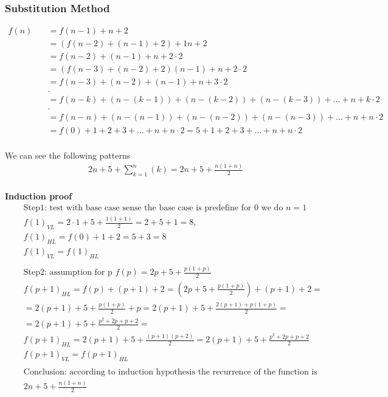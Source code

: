 \subsubsection{Substitution Method}
\begin{align*}
  f(n) &\quad = f(n-1) + n + 2  \\
  &\quad = (f(n-2) + (n-1) + 2) +1n +2 \\               &\quad = f(n-2) + (n-1) + n +2 \cdot 2 \\
  &\quad = (f(n-3) + (n-2) + 2) (n-1) + n +2 \cdot 2 \\ &\quad = f(n-3) +(n-2) + (n-1) + n +3 \cdot 2 \\
  &\quad . \\
  &\quad = f(n-k) + (n -(k-1)) + (n -(k-2)) + (n -(k-3)) + \ldots + n +k \cdot 2  \\
  &\quad . \\
  &\quad = f(n-n) + (n -(n-1)) + (n -(n-2)) + (n -(n-3)) + \ldots + n +n \cdot 2 \\
  &\quad = f(0) +1 +2 +3 + \ldots + n +n \cdot 2 = 5 +1 +2 +3 + \ldots + n +n \cdot 2\\
\end{align*}

We can see the following patterns
\begin{align*}
  &\quad 2n + 5 + \displaystyle\sum_{k=1}^{n}(k) = 2n + 5 + \frac{n(1+n)}{2} \\
\end{align*}

\noindent\textbf{Induction proof}
\begin{align*}
  &\quad  \text{Step1: test with base case sense the base case is predefine for 0 we do } n=1  \\
  &\quad  {f(1)}_{VL} = 2 \cdot 1 + 5 + \frac{1(1+1)}{2} = 2 +5 +1 = 8, \\
  &\quad  {f(1)}_{HL} = f(0) + 1 +2 = 5 +3 = 8 \\
  &\quad  {f(1)}_{VL} = {f(1)}_{HL} \\
  &\quad  \\
  &\quad  \text{Step2: assumption for p } f(p) = 2p + 5 + \frac{p(1+p)}{2} \\
  &\quad  {f(p+1)}_{HL} = f(p) +(p+1) +2 = (2p +5 +\frac{p(1+p)}{2}) + (p+1) + 2 = \\
  &\quad  = 2(p+1) +5 +\frac{p(1+p)}{2} +p = 2(p+1) +5 +\frac{2(p+1)+p(1+p)}{2} = \\
  &\quad  = 2(p+1) +5 +\frac{p^2 +2p +p +2}{2} = \\
  &\quad  {f(p+1)}_{HL} = 2(p+1) + 5 + \frac{(p+1)(p+2)}{2} = 2(p+1) + 5 + \frac{p^2 +2p +p +2}{2}  \\
  &\quad  {f(p+1)}_{VL} = {f(p+1)}_{HL} \\
  &\quad  \\
  &\quad  \text{Conclusion: according to induction hypothesis the recurrence of the function is equal to } \\
  &\quad  2n + 5 + \frac{n(1+n)}{2} 
\end{align*}


